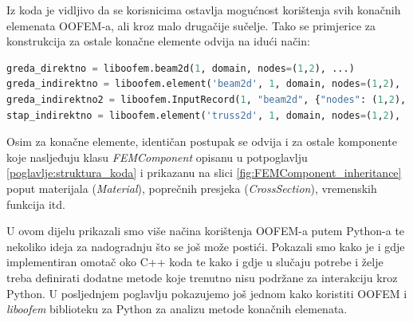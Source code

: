 \documentclass[a4paper,twoside,12pt]{memoir} %
\begin{document}
Iz koda je vidljivo da se korisnicima ostavlja mogućnost korištenja svih konačnih elemenata OOFEM-a, ali kroz malo drugačije sučelje. Tako se primjerice za konstrukcija za ostale konačne elemente odvija na idući način:

\begin{lstlisting}[language=python, caption={Primjer konstrukcije konačnih elemenata koji nemaju implementiran direktan poziv}]
greda_direktno = liboofem.beam2d(1, domain, nodes=(1,2), ...)
greda_indirektno = liboofem.element('beam2d', 1, domain, nodes=(1,2), ...)
greda_indirektno2 = liboofem.InputRecord(1, "beam2d", {"nodes": (1,2), ...})
stap_indirektno = liboofem.element('truss2d', 1, domain, nodes=(1,2), ...)
\end{lstlisting}

Osim za konačne elemente, identičan postupak se odvija i za ostale komponente koje nasljeđuju klasu \textit{FEMComponent} opisanu u potpoglavlju \ref{poglavlje:struktura_koda} i prikazanu na slici \ref{fig:FEMComponent_inheritance} poput materijala (\textit{Material}), poprečnih presjeka (\textit{CrossSection}), vremenskih funkcija itd. \par

U ovom dijelu prikazali smo više načina korištenja OOFEM-a putem Python-a te nekoliko ideja za nadogradnju što se još može postići. Pokazali smo kako je i gdje implementiran omotač oko C++ koda te kako i gdje u slučaju potrebe i želje treba definirati dodatne metode koje trenutno nisu podržane za interakciju kroz Python. U posljednjem poglavlju pokazujemo još jednom kako koristiti OOFEM i \textit{liboofem} biblioteku za Python za analizu metode konačnih elemenata.
\end{document}
